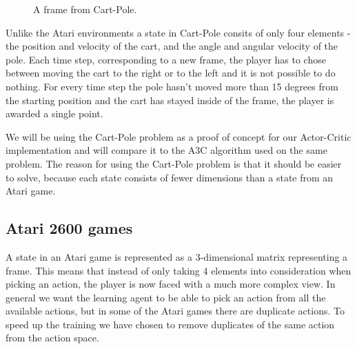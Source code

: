 \documentclass[11pt]{article}
\begin{document}
\begin{figure}[!h]
    \centering
    \caption{A frame from Cart-Pole.}
    \label{fig:cartpole}
\end{figure}

Unlike the Atari environments a state in Cart-Pole consits of only four elements - the position and velocity of the cart, and the
angle and angular velocity of the pole.
Each time step, corresponding to a new frame, the player has to chose between moving the cart to the right or to the left and it is not possible
to do nothing.
For every time step the pole hasn't moved more than 15 degrees from the starting position and
the cart has stayed inside of the frame, the player is awarded a single point.

We will be using the Cart-Pole problem as a proof of concept for our Actor-Critic implementation and will
compare it to the A3C algorithm used on the same problem.
The reason for using the Cart-Pole problem is that it should be easier
to solve, because each state consists of fewer dimensions than a state
from an Atari game.


\subsection{Atari 2600 games}\label{sec:atari}

A state in an Atari game is represented as a 3-dimensional matrix representing a
frame.
This means that instead of only taking 4 elements into consideration when picking an action,
the player is now faced with a much more complex view. 
In general we want the learning agent to be able to pick an action from all
the available actions, but in some of the Atari games there are duplicate actions.
To speed up the training we have chosen to remove duplicates of the same action
from the action space.
\end{document}
